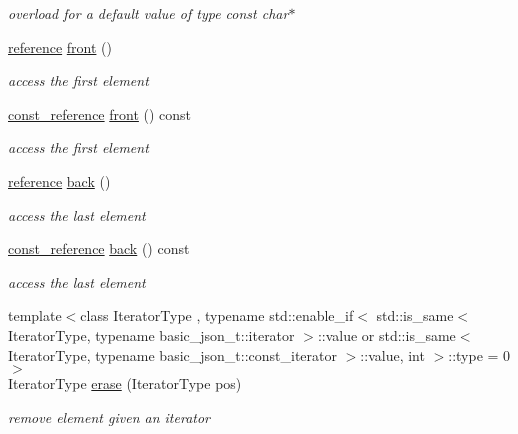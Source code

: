 \begin{DoxyCompactItemize}
\begin{DoxyCompactList}\small\item\em overload for a default value of type const char$\ast$ \end{DoxyCompactList}\item 
\mbox{\hyperlink{classnlohmann_1_1basic__json_ac6a5eddd156c776ac75ff54cfe54a5bc}{reference}} \mbox{\hyperlink{classnlohmann_1_1basic__json_a3acba9c6ceb7214e565fe08c3ba5b352}{front}} ()
\begin{DoxyCompactList}\small\item\em access the first element \end{DoxyCompactList}\item 
\mbox{\hyperlink{classnlohmann_1_1basic__json_a4057c5425f4faacfe39a8046871786ca}{const\+\_\+reference}} \mbox{\hyperlink{classnlohmann_1_1basic__json_a4b1fb3671ade9afc8d33b2c9510acbfc}{front}} () const
\begin{DoxyCompactList}\small\item\em access the first element \end{DoxyCompactList}\item 
\mbox{\hyperlink{classnlohmann_1_1basic__json_ac6a5eddd156c776ac75ff54cfe54a5bc}{reference}} \mbox{\hyperlink{classnlohmann_1_1basic__json_a011397134847f36db0ed7d7a93753677}{back}} ()
\begin{DoxyCompactList}\small\item\em access the last element \end{DoxyCompactList}\item 
\mbox{\hyperlink{classnlohmann_1_1basic__json_a4057c5425f4faacfe39a8046871786ca}{const\+\_\+reference}} \mbox{\hyperlink{classnlohmann_1_1basic__json_a83fe4a151b3a591f357527d5d9aa1b9f}{back}} () const
\begin{DoxyCompactList}\small\item\em access the last element \end{DoxyCompactList}\item 
{\footnotesize template$<$class Iterator\+Type , typename std\+::enable\+\_\+if$<$ std\+::is\+\_\+same$<$ Iterator\+Type, typename basic\+\_\+json\+\_\+t\+::iterator $>$\+::value or std\+::is\+\_\+same$<$ Iterator\+Type, typename basic\+\_\+json\+\_\+t\+::const\+\_\+iterator $>$\+::value, int $>$\+::type  = 0$>$ }\\Iterator\+Type \mbox{\hyperlink{classnlohmann_1_1basic__json_a068a16e76be178e83da6a192916923ed}{erase}} (Iterator\+Type pos)
\begin{DoxyCompactList}\small\item\em remove element given an iterator \end{DoxyCompactList}\item 

\end{DoxyCompactItemize}
